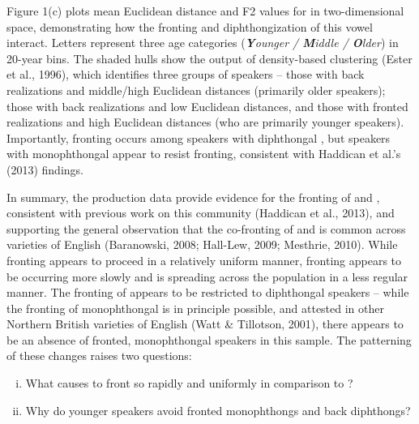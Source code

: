 \documentclass[PWPL]{article}
\begin{document}
Figure 1(c) plots mean Euclidean distance and F2 values for  in two-dimensional space, demonstrating how the fronting and diphthongization of this vowel interact. Letters represent three age categories (\textit{\textbf{Y}ounger / \textbf{M}iddle / \textbf{O}lder}) in 20-year bins. The shaded hulls show the output of density-based clustering (Ester et al., 1996), which identifies three groups of speakers -- those with back  realizations and middle/high Euclidean distances (primarily older speakers); those with back  realizations and low Euclidean distances, and those with fronted  realizations and high Euclidean distances (who are primarily younger speakers). Importantly, fronting occurs among speakers with diphthongal , but speakers with monophthongal  appear to resist fronting, consistent with Haddican et al.'s (2013) findings.

In summary, the production data provide evidence for the fronting of  and , consistent with previous work on this community (Haddican et al., 2013), and supporting the general observation that the co-fronting of  and  is common across varieties of English (Baranowski, 2008; Hall-Lew, 2009; Mesthrie, 2010). While  fronting appears to proceed in a relatively uniform manner,  fronting appears to be occurring more slowly and is spreading across the population in a less regular manner. The fronting of  appears to be restricted to diphthongal speakers -- while the fronting of monophthongal  is in principle possible, and attested in other Northern British varieties of English (Watt \& Tillotson, 2001), there appears to be an absence of fronted, monophthongal speakers in this sample. The patterning of these changes raises two questions:

\begin{enumerate}[i)]
\item{What causes  to front so rapidly and uniformly in comparison to ?}
\item{Why do younger speakers avoid fronted  monophthongs and back  diphthongs?}
\end{enumerate}
\end{document}
